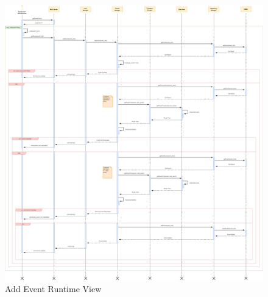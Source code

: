 \begin{figure}[H]
	\centering
	\includegraphics[scale=0.15]{Images/Runtime/Add_Event}
	\caption{Add Event Runtime View}
\end{figure}

